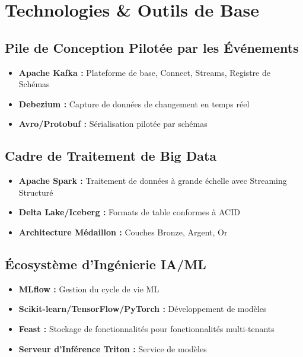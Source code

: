 \documentclass[11pt]{article}
\begin{document}
\section{Technologies \& Outils de Base}

\subsection{Pile de Conception Pilotée par les Événements}
\begin{itemize}
    \item \textbf{Apache Kafka :} Plateforme de base, Connect, Streams, Registre de Schémas
    \item \textbf{Debezium :} Capture de données de changement en temps réel
    \item \textbf{Avro/Protobuf :} Sérialisation pilotée par schémas
\end{itemize}

\subsection{Cadre de Traitement de Big Data}
\begin{itemize}
    \item \textbf{Apache Spark :} Traitement de données à grande échelle avec Streaming Structuré
    \item \textbf{Delta Lake/Iceberg :} Formats de table conformes à ACID
    \item \textbf{Architecture Médaillon :} Couches Bronze, Argent, Or
\end{itemize}

\subsection{Écosystème d'Ingénierie IA/ML}
\begin{itemize}
    \item \textbf{MLflow :} Gestion du cycle de vie ML
    \item \textbf{Scikit-learn/TensorFlow/PyTorch :} Développement de modèles
    \item \textbf{Feast :} Stockage de fonctionnalités pour fonctionnalités multi-tenants
    \item \textbf{Serveur d'Inférence Triton :} Service de modèles
\end{itemize}

\end{document}
